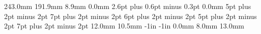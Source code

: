 \newcommand{\ds}{\displaystyle}
\newcommand{\mbf}[1]{\mbox{\boldmath$#1$}}
\newcommand{\ubar}[1]{\overline{#1}}
\newcommand{\hs}{\hspace*{0.2mm}}
\newcommand{\npar}{\par\vspace*{4pt}}
%
\newcommand{\isoperef}[1]{%
  \par\noindent\hangindent=4.2mm\hangafter=1{\fontsize{7.4}{8.5}\selectfont #1}\par\vspace*{0.45mm}%
}
%
\setlength{\textheight}  {243.0mm}
\setlength{\textwidth}   {191.9mm}
\setlength{\columnsep}   {8.9mm}
\setlength{\parindent}   {0.0mm}
\setlength{\parskip}     {2.6pt plus 0.6pt minus 0.3pt}
\setlength{\mathindent}  {0.0mm}
\setlength{\floatsep}        {5pt plus 2pt minus 2pt}
\setlength{\textfloatsep}    {7pt plus 2pt minus 2pt}
\setlength{\intextsep}       {6pt plus 2pt minus 2pt}
\setlength{\dblfloatsep}     {5pt plus 2pt minus 2pt}
\setlength{\dbltextfloatsep} {7pt plus 2pt minus 2pt}
\setlength{\abovedisplayskip}{3.5pt plus 1pt minus 1pt}
\setlength{\belowdisplayskip}{3.5pt plus 1pt minus 1pt}
%
\newlength{\mybaselineskip}
\setlength{\mybaselineskip}{9.85pt}
\newlength{\myleftmargin}
\newlength{\mytopmargin}
\setlength{\myleftmargin}  {12.0mm}
\setlength{\mytopmargin}   {10.5mm}
\setlength{\oddsidemargin} {-1in}
\setlength{\topmargin}     {-1in}
\addtolength{\oddsidemargin}{\myleftmargin}
\addtolength{\topmargin}    {\mytopmargin}
\setlength{\headheight}  { 0.0mm}
\setlength{\headsep}     { 8.0mm}
\setlength{\footskip}    {13.0mm}
%
\sloppy
